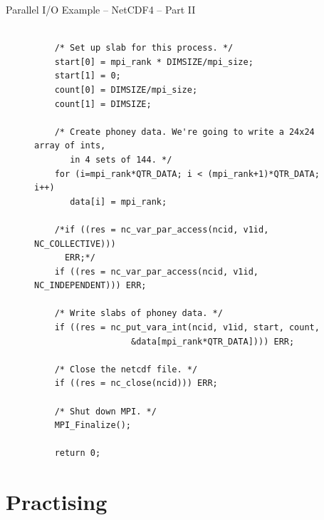 \documentclass[compress,11pt,xcolor=svgnames,aspectratio=169]{beamer}
\begin{document}
\begin{frame}[fragile]{Parallel I/O Example -- NetCDF4 -- Part II}

\begin{figure}
\centering
\begin{varwidth}{\linewidth}
{ \tiny

\begin{verbatim}

    /* Set up slab for this process. */
    start[0] = mpi_rank * DIMSIZE/mpi_size;
    start[1] = 0;
    count[0] = DIMSIZE/mpi_size;
    count[1] = DIMSIZE;

    /* Create phoney data. We're going to write a 24x24 array of ints,
       in 4 sets of 144. */
    for (i=mpi_rank*QTR_DATA; i < (mpi_rank+1)*QTR_DATA; i++)
       data[i] = mpi_rank;

    /*if ((res = nc_var_par_access(ncid, v1id, NC_COLLECTIVE)))
      ERR;*/
    if ((res = nc_var_par_access(ncid, v1id, NC_INDEPENDENT))) ERR;

    /* Write slabs of phoney data. */
    if ((res = nc_put_vara_int(ncid, v1id, start, count,
			       &data[mpi_rank*QTR_DATA]))) ERR;

    /* Close the netcdf file. */
    if ((res = nc_close(ncid)))	ERR;

    /* Shut down MPI. */
    MPI_Finalize();

    return 0;

\end{verbatim}

}
\end{varwidth}
\end{figure}

\end{frame}

\section{Practising}
\end{document}
